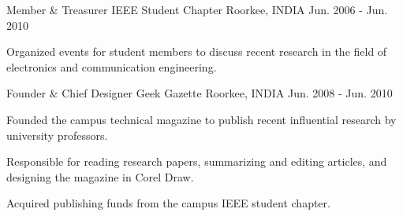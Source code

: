 

\begin{cventries}


  \cventry
    {Member \& Treasurer} %
    {IEEE Student Chapter} %
    {Roorkee, INDIA} %
    {Jun. 2006 - Jun. 2010} %
    {
      \begin{cvitems} %
        \item {Organized events for student members to discuss recent research in the field of electronics and communication engineering.}
      \end{cvitems}
    }

  \cventry
    {Founder \& Chief Designer} %
    {Geek Gazette} %
    {Roorkee, INDIA} %
    {Jun. 2008 - Jun. 2010} %
    {
      \begin{cvitems} %
        \item {Founded the campus technical magazine to publish recent influential research by university professors.}
        \item {Responsible for reading research papers, summarizing and editing articles, and designing the magazine in Corel Draw.}
        \item {Acquired publishing funds from the campus IEEE student chapter.}
      \end{cvitems}
    }


\end{cventries}
